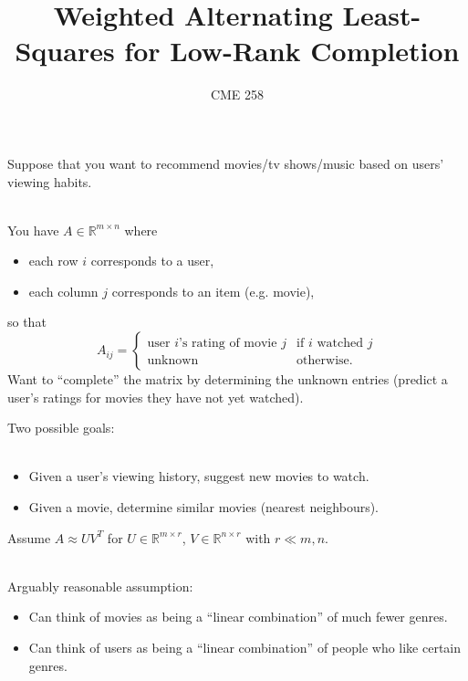 \documentclass[12pt]{beamer}
\title[]{Weighted Alternating Least-Squares for Low-Rank Completion}
\author[Ron Estrin, Brad Nelson (ICME)]{CME 258}
\newcommand{\RR}{\mathbb{R}}
\begin{document}
\frame{\titlepage}

\begin{frame}
Suppose that you want to recommend movies/tv shows/music based on users' viewing habits.
\\~

You have $A \in \RR^{m \times n}$ where
\begin{itemize}
\item each row $i$ corresponds to a user,
\item each column $j$ corresponds to an item (e.g. movie),
\end{itemize}
so that
$$ A_{ij} = \begin{cases} \mbox{user $i$'s rating of movie $j$} & \mbox{if $i$ watched $j$} \\ \mbox{unknown} & \mbox{otherwise.} \end{cases}$$
Want to ``complete'' the matrix by determining the unknown entries (predict a user's ratings for movies they have not yet watched).
\end{frame}

\begin{frame}
Two possible goals:
\\~
\begin{itemize}
\item Given a user's viewing history, suggest new movies to watch.
\item Given a movie, determine similar movies (nearest neighbours).
\end{itemize}
\end{frame}

\begin{frame}
Assume $A \approx UV^T$ for $U \in \RR^{m \times r}$, $V \in \RR^{n \times r}$ with $r \ll m,n$.
\\~

Arguably reasonable assumption:
\begin{itemize}
\item Can think of movies as being a ``linear combination'' of much fewer genres.
\item Can think of users as being a ``linear combination'' of people who like certain genres.
\end{itemize}
\end{frame}
\end{document}
